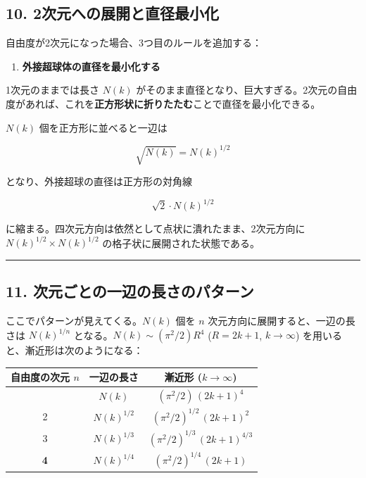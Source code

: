 \documentclass[a4paper,11pt]{ltjsarticle}
\theoremstyle{definition}
\providecommand{\tightlist}{\setlength{\itemsep}{0pt}\setlength{\parskip}{0pt}}
\begin{document}
\subsection{10.
2次元への展開と直径最小化}\label{ux6b21ux5143ux3078ux306eux5c55ux958bux3068ux76f4ux5f84ux6700ux5c0fux5316}

自由度が2次元になった場合、3つ目のルールを追加する：

\begin{enumerate}
\def\labelenumi{\arabic{enumi}.}
\setcounter{enumi}{2}
\tightlist
\item
  \textbf{外接超球体の直径を最小化する}
\end{enumerate}

1次元のままでは長さ \(N(k)\)
がそのまま直径となり、巨大すぎる。2次元の自由度があれば、これを\textbf{正方形状に折りたたむ}ことで直径を最小化できる。

\(N(k)\) 個を正方形に並べると一辺は

\[\sqrt{N(k)} = N(k)^{1/2}\]

となり、外接超球の直径は正方形の対角線

\[\sqrt{2} \cdot N(k)^{1/2}\]

に縮まる。四次元方向は依然として点状に潰れたまま、2次元方向に
\(N(k)^{1/2} \times N(k)^{1/2}\) の格子状に展開された状態である。

\begin{center}\rule{0.5\linewidth}{0.5pt}\end{center}

\subsection{11.
次元ごとの一辺の長さのパターン}\label{ux6b21ux5143ux3054ux3068ux306eux4e00ux8fbaux306eux9577ux3055ux306eux30d1ux30bfux30fcux30f3}

ここでパターンが見えてくる。\(N(k)\) 個を \(n\)
次元方向に展開すると、一辺の長さは \(N(k)^{1/n}\)
となる。\(N(k) \sim (\pi^2/2) R^4\) (\(R = 2k+1\), \(k \to \infty\))
を用いると、漸近形は次のようになる：

{\def\LTcaptype{none} %
\begin{longtable}[]{@{}ccc@{}}
\toprule\noalign{}
自由度の次元 \(n\) & 一辺の長さ & 漸近形 (\(k \to \infty\)) \\
\midrule\noalign{}
\endhead
\bottomrule\noalign{}
\endlastfoot
1 & \(N(k)\) & \((\pi^2/2)\,(2k+1)^4\) \\
2 & \(N(k)^{1/2}\) & \((\pi^2/2)^{1/2}\,(2k+1)^2\) \\
3 & \(N(k)^{1/3}\) & \((\pi^2/2)^{1/3}\,(2k+1)^{4/3}\) \\
\textbf{4} & \(N(k)^{1/4}\) & \((\pi^2/2)^{1/4}\,(2k+1)\) \\
\end{longtable}
}
\end{document}

